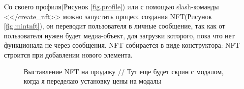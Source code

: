 Cо своего профиля(Рисунок {\color{blue} \ref{fig.profile}}) или с помощью slash-команды <</create\_nft>> можно запустить процесс создания NFT(Рисунок {\color{blue} \ref{fig.mintnft}}), он переводит пользователя в личные сообщение, так как от пользователя нужен будет медиа-объект, для загрузки которого, пока что нет функционала не через сообщения. NFT собирается в виде конструктора: NFT строится при добавлении нового элемента.

\begin{figure}
    \centering
    \caption{Выставление NFT на продажу // Тут еще будет скрин с модалом, когда я переделаю установку цены на модалы}
\end{figure}

